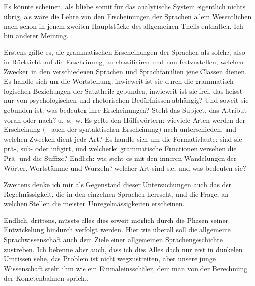 Es könnte scheinen, als bliebe somit für das analytische System eigentlich nichts übrig, als wäre die Lehre von den Erscheinungen der Sprachen allem Wesentlichen nach schon in jenem zweiten Hauptstücke des allgemeinen Theils enthalten. Ich bin anderer Meinung.

\largerpage
Erstens gälte es, die grammatischen Erscheinungen der Sprachen als solche, also in Rücksicht auf die Erscheinung, zu classificiren und nun festzustellen, welchen Zwecken in den verschiedenen Sprachen und Sprachfamilien jene Classen dienen. Es handle sich um die Wortstellung: inwieweit ist sie durch die gram\-matisch-logischen Beziehungen der Satztheile gebunden, inwieweit ist sie frei, das heisst nur von psychologischen und rhetorischen Bedürfnissen abhängig? Und soweit sie gebunden ist: was bedeuten ihre Erscheinungen? Steht das Subject, das Attribut voran oder nach? u.~s.~w. Es gelte den Hülfswörtern: wieviele Arten werden der Erscheinung (– auch der syntaktischen Erscheinung) nach unterschieden, und welchen Zwecken dient jede Art? Es handle sich um die Formativlaute: sind sie prä-, sub- oder infigirt, und welcherlei grammatische Functionen versehen die Prä- und die Suffixe? Endlich: wie steht es mit den inneren Wandelungen der Wörter, Wortstämme und Wurzeln? welcher Art sind sie, und was bedeuten sie?

\label{sp.481}

Zweitens denke ich mir als Gegenstand dieser Untersuchungen auch das  der Regelmässigkeit, die in den einzelnen Sprachen herrscht, und die Frage, an welchen Stellen die meisten Unregelmässigkeiten erscheinen.

Endlich, drittens, müsste alles dies soweit möglich durch die Phasen seiner Entwickelung hindurch verfolgt werden. Hier wie überall soll die allgemeine Sprachwissenschaft auch dem Ziele einer allgemeinen Sprachengeschichte zustreben. Ich bekenne aber auch, dass ich dies Alles doch \label{fp.462} nur erst in dunkelen Umrissen sehe, das Problem ist nicht wegzustreiten, aber unsere junge Wissenschaft steht ihm  wie ein Einmaleinsschüler, dem man von der Berechnung der Kometenbahnen spricht.



